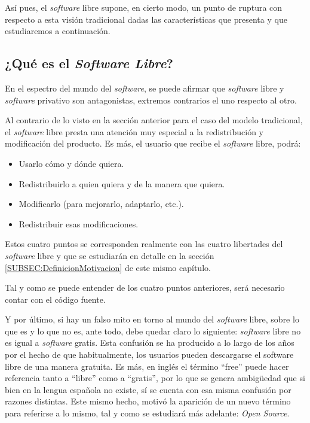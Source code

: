 Así pues, el \textit{software} libre supone, en cierto modo, un punto de ruptura
con respecto a esta visión tradicional dadas las características que presenta y
que estudiaremos a continuación.

\subsection{¿Qué es el \textit{Software Libre}?}

En el espectro del mundo del \textit{software}, se puede afirmar que
\textit{software} libre y \textit{software} privativo son antagonistas, extremos
contrarios el uno respecto al otro.

Al contrario de lo visto en la sección anterior para el caso del modelo
tradicional, el \textit{software} libre presta una atención muy especial a la
redistribución y modificación del producto. Es más, el usuario que recibe el
\textit{software} libre, podrá:

\begin{itemize}
  \item Usarlo cómo y dónde quiera.
  \item Redistribuirlo a quien quiera y de la manera que quiera.
  \item Modificarlo (para mejorarlo, adaptarlo, etc.).
  \item Redistribuir esas modificaciones.
\end{itemize}

Estos cuatro puntos se corresponden realmente con las cuatro libertades del
\textit{software} libre y que se estudiarán en detalle en la sección
\ref{SUBSEC:DefinicionMotivacion} de este mismo capítulo.

Tal y como se puede entender de los cuatro puntos anteriores, será necesario
contar con el código fuente.

Y por último, si hay un falso mito en torno al mundo del \textit{software}
libre, sobre lo que es y lo que no es, ante todo, debe quedar claro lo
siguiente: \textit{software} libre no es igual a \textit{software} gratis. Esta
confusión se ha producido a lo largo de los años por el hecho de que
habitualmente, los usuarios pueden descargarse el software libre de una manera
gratuita. Es más, en inglés el término ``free'' puede hacer referencia tanto a
``libre'' como a ``gratis'', por lo que se genera ambigüedad que si bien en
la lengua española no existe, sí se cuenta con esa misma confusión por razones
distintas. Este mismo hecho, motivó la aparición de un nuevo término para
referirse a lo mismo, tal y como se estudiará más adelante: \textit{Open
Source}.

